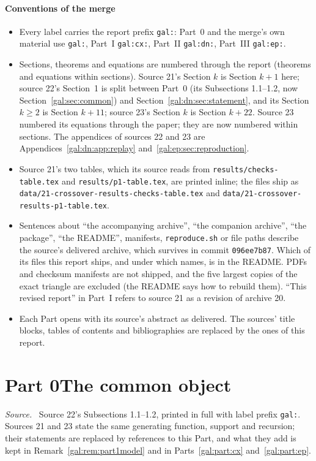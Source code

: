\documentclass[11pt,letterpaper]{article}
\numberwithin{equation}{section}
\theoremstyle{definition}\newtheorem{definition}[theorem]{Definition}
\theoremstyle{remark}\newtheorem{remark}[theorem]{Remark}
\newenvironment{partsource}{\par\medskip\noindent\begin{minipage}{\linewidth}\small\raggedright\textit{Source.}\ }{\end{minipage}\par\medskip}
\newcommand{\repopath}[1]{\nolinkurl{#1}}
\begin{document}
\subsection*{Conventions of the merge}
\label{gal:guide:conventions}
\begin{itemize}
\item Every label carries the report prefix \texttt{gal:}: Part~0 and the merge's own material use \texttt{gal:}, Part~I \texttt{gal:cx:}, Part~II \texttt{gal:dn:}, Part~III \texttt{gal:ep:}.
\item Sections, theorems and equations are numbered through the report (theorems and equations within sections). Source 21's Section $k$ is Section $k+1$ here; source 22's Section~1 is split between Part~0 (its Subsections 1.1--1.2, now Section~\ref{gal:sec:common}) and Section~\ref{gal:dn:sec:statement}, and its Section $k\ge2$ is Section $k+11$; source 23's Section $k$ is Section $k+22$. Source 23 numbered its equations through the paper; they are now numbered within sections. The appendices of sources 22 and 23 are Appendices~\ref{gal:dn:app:replay} and~\ref{gal:ep:sec:reproduction}.
\item Source 21's two tables, which its source reads from \repopath{results/checks-table.tex} and \repopath{results/p1-table.tex}, are printed inline; the files ship as \repopath{data/21-crossover-results-checks-table.tex} and \repopath{data/21-crossover-results-p1-table.tex}.
\item Sentences about ``the accompanying archive'', ``the companion archive'', ``the package'', ``the README'', manifests, \texttt{reproduce.sh} or file paths describe the source's delivered archive, which survives in commit \texttt{096ee7b87}. Which of its files this report ships, and under which names, is in the README. PDFs and checksum manifests are not shipped, and the five largest copies of the exact triangle are excluded (the README says how to rebuild them). ``This revised report'' in Part~I refers to source 21 as a revision of archive 20.
\item Each Part opens with its source's abstract as delivered. The sources' title blocks, tables of contents and bibliographies are replaced by the ones of this report.
\end{itemize}

\part*{Part 0\quad The common object}
\label{gal:part:common}
\begin{partsource}
Source 22's Subsections 1.1--1.2, printed in full with label prefix \texttt{gal:}. Sources 21 and 23 state the same generating function, support and recursion; their statements are replaced by references to this Part, and what they add is kept in Remark~\ref{gal:rem:part1model} and in Parts~\ref{gal:part:cx} and~\ref{gal:part:ep}.
\end{partsource}
\end{document}
